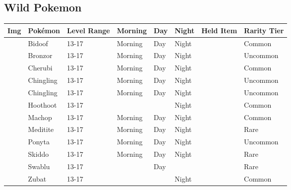 \subsection{Wild Pokemon}%
\label{subsec:WildPokemon}%
\begin{longtable}{||l l l l l l l l||}%
\hline%
Img&Pokémon&Level Range&Morning&Day&Night&Held Item&Rarity Tier\\%
\hline%
\endhead%
\hline%
&Bidoof&13{-}17&Morning&Day&Night&&Common\\%
\hline%
&Bronzor&13{-}17&Morning&Day&Night&&Uncommon\\%
\hline%
&Cherubi&13{-}17&Morning&Day&Night&&Common\\%
\hline%
&Chingling&13{-}17&Morning&Day&Night&&Uncommon\\%
\hline%
&Chingling&13{-}17&Morning&Day&Night&&Uncommon\\%
\hline%
&Hoothoot&13{-}17&&&Night&&Common\\%
\hline%
&Machop&13{-}17&Morning&Day&Night&&Common\\%
\hline%
&Meditite&13{-}17&Morning&Day&Night&&Rare\\%
\hline%
&Ponyta&13{-}17&Morning&Day&Night&&Uncommon\\%
\hline%
&Skiddo&13{-}17&Morning&Day&Night&&Rare\\%
\hline%
&Swablu&13{-}17&&Day&&&Rare\\%
\hline%
&Zubat&13{-}17&&&Night&&Common\\%
\hline%
\end{longtable}